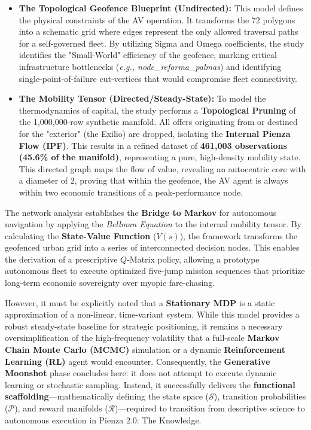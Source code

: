 \begin{itemize}[noitemsep, topsep=3pt]
    \item \textbf{The Topological Geofence Blueprint (Undirected):} This model defines the physical constraints of the AV operation. It transforms the 72 polygons into a schematic grid where edges represent the only allowed traversal paths for a self-governed fleet. By utilizing Sigma and Omega coefficients, the study identifies the "Small-World" efficiency of the geofence, marking critical infrastructure bottlenecks (\textit{e.g., node\_reforma\_palmas}) and identifying single-point-of-failure cut-vertices that would compromise fleet connectivity.
    
    \item \textbf{The Mobility Tensor (Directed/Steady-State):} To model the thermodynamics of capital, the study performs a \textbf{Topological Pruning} of the 1,000,000-row synthetic manifold. All offers originating from or destined for the "exterior" (the Exilio) are dropped, isolating the \textbf{Internal Pienza Flow (IPF)}. This results in a refined dataset of \textbf{461,003 observations (45.6\% of the manifold)}, representing a pure, high-density mobility state. This directed graph maps the flow of value, revealing an autocentric core with a diameter of 2, proving that within the geofence, the AV agent is always within two economic transitions of a peak-performance node.
\end{itemize}

The network analysis establishes the \textbf{Bridge to Markov} for autonomous navigation by applying the \textit{Bellman Equation} to the internal mobility tensor. By calculating the \textbf{State-Value Function} ($V(s)$), the framework transforms the geofenced urban grid into a series of interconnected decision nodes. This enables the derivation of a prescriptive $Q$-Matrix policy, allowing a prototype autonomous fleet to execute optimized five-jump mission sequences that prioritize long-term economic sovereignty over myopic fare-chasing. 

However, it must be explicitly noted that a \textbf{Stationary MDP} is a static approximation of a non-linear, time-variant system. While this model provides a robust steady-state baseline for strategic positioning, it remains a necessary oversimplification of the high-frequency volatility that a full-scale \textbf{Markov Chain Monte Carlo (MCMC)} simulation or a dynamic \textbf{Reinforcement Learning (RL)} agent would encounter. Consequently, the \textbf{Generative Moonshot} phase concludes here: it does not attempt to execute dynamic learning or stochastic sampling. Instead, it successfully delivers the \textbf{functional scaffolding}---mathematically defining the state space ($\mathcal{S}$), transition probabilities ($\mathcal{P}$), and reward manifolds ($\mathcal{R}$)---required to transition from descriptive science to autonomous execution in Pienza 2.0: The Knowledge.


